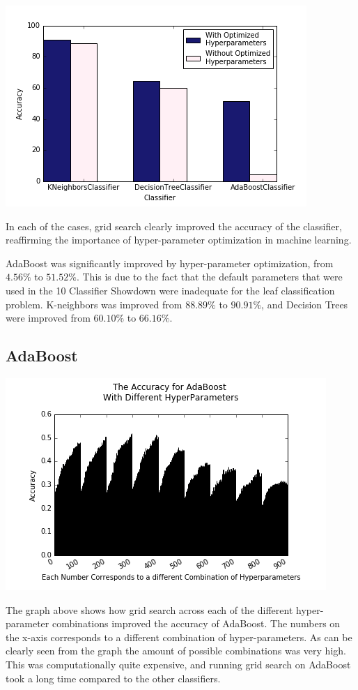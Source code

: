\documentclass{article}
\begin{document}
\includegraphics[scale=0.7]{acc_class}

In each of the cases, grid search clearly improved the accuracy of the classifier, reaffirming the importance of hyper-parameter optimization in machine learning. 

AdaBoost was significantly improved by hyper-parameter optimization, from $4.56\%$ to $51.52\%$. This is due to the fact that the default parameters that were used in the 10 Classifier Showdown \cite{showdown} were inadequate for the leaf classification problem. K-neighbors was improved from $88.89\%$ to $90.91\%$, and Decision Trees were improved from $60.10\%$ to $66.16\%$. 

\subsection{AdaBoost}

\includegraphics[scale=0.6]{adaboost_crop}

The graph above shows how grid search across each of the different hyper-parameter combinations improved the accuracy of AdaBoost. The numbers on the x-axis corresponds to a different combination of hyper-parameters. As can be clearly seen from the graph the amount of possible combinations was very high. This was computationally quite expensive, and running grid search on AdaBoost took a long time compared to the other classifiers. 
\end{document}
